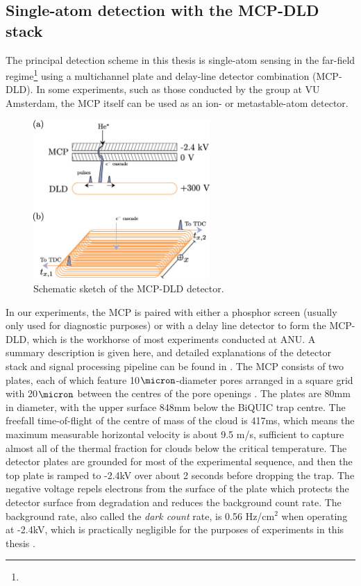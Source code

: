 \subsection*{Single-atom detection with the MCP-DLD stack}
	\label{sec:DLD}
	The principal detection scheme in this thesis is single-atom sensing in the far-field regime\footnote{} using a multichannel plate and delay-line detector combination (MCP-DLD).
	In some experiments, such as those conducted by the \mhe group at VU Amsterdam, the MCP itself can be used as an ion- or metastable-atom detector.

	\begin{figure}
		\centering
		\includegraphics[width=0.6\textwidth]{fig/apparatus/mcp_dld_schematic}
		\caption{Schematic sketch of the MCP-DLD detector. }
		\label{fig:MCP_DLD}
	\end{figure}

	In our experiments, the MCP is paired with either a phosphor screen (usually only used for diagnostic purposes) or with a delay line detector to form the MCP-DLD, which is the workhorse of most experiments conducted at ANU.
	A summary description is given here, and detailed explanations of the detector stack and signal processing pipeline can be found in \cite{ShinThesis, HodgmanThesis, ManningThesis}.
	The MCP consists of two plates, each of which feature 10$\micron$-diameter pores arranged in a square grid with 20$\micron$ between the centres of the pore openings .
	The plates are 80mm in diameter, with the upper surface 848mm below the BiQUIC trap centre.
	The freefall time-of-flight of the centre of mass of the cloud is 417ms, which means the maximum measurable horizontal velocity is about 9.5 m/s, sufficient to capture almost all of the thermal fraction for clouds below the critical temperature.
	The detector plates are grounded for most of the experimental sequence, and then the top plate is ramped to -2.4kV over about 2 seconds before dropping the trap.
	The negative voltage repels electrons from the surface of the plate which protects the detector surface from degradation and reduces the background count rate.
	The background rate, also called the \emph{dark count} rate, is 0.56 Hz/cm$^2$ when operating at -2.4kV, which is practically negligible for the purposes of experiments in this thesis .
	


